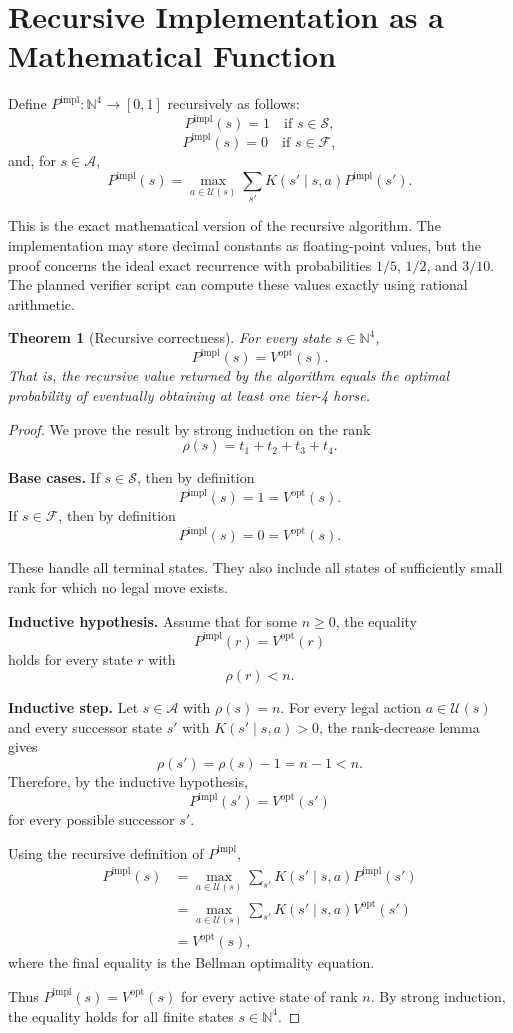 \documentclass[11pt]{article}
\newtheorem{theorem}{Theorem}[section]
\newcommand{\N}{\mathbb{N}}
\newcommand{\Success}{\mathcal{S}}
\newcommand{\Failure}{\mathcal{F}}
\newcommand{\Active}{\mathcal{A}}
\newcommand{\Actions}{\mathcal{U}}
\newcommand{\rank}{\rho}
\newcommand{\impl}{\mathrm{impl}}
\newcommand{\opt}{\mathrm{opt}}
\begin{document}
\section{Recursive Implementation as a Mathematical Function}

Define \(P^\impl:\N^4\to[0,1]\) recursively as follows:
\[
    P^\impl(s)=1\quad\text{if }s\in\Success,
\]
\[
    P^\impl(s)=0\quad\text{if }s\in\Failure,
\]
and, for \(s\in\Active\),
\[
    P^\impl(s)=
    \max_{a\in\Actions(s)}
    \sum_{s'}K(s'\mid s,a)P^\impl(s').
\]

This is the exact mathematical version of the recursive algorithm.  The implementation may store decimal constants as floating-point values, but the proof concerns the ideal exact recurrence with probabilities \(1/5\), \(1/2\), and \(3/10\).  The planned verifier script can compute these values exactly using rational arithmetic.

\begin{theorem}[Recursive correctness]
For every state \(s\in\N^4\),
\[
    P^\impl(s)=V^\opt(s).
\]
That is, the recursive value returned by the algorithm equals the optimal probability of eventually obtaining at least one tier-4 horse.
\end{theorem}

\begin{proof}
We prove the result by strong induction on the rank
\[
    \rank(s)=t_1+t_2+t_3+t_4.
\]

\textbf{Base cases.}
If \(s\in\Success\), then by definition
\[
    P^\impl(s)=1=V^\opt(s).
\]
If \(s\in\Failure\), then by definition
\[
    P^\impl(s)=0=V^\opt(s).
\]

These handle all terminal states.  They also include all states of sufficiently small rank for which no legal move exists.

\textbf{Inductive hypothesis.}
Assume that for some \(n\ge0\), the equality
\[
    P^\impl(r)=V^\opt(r)
\]
holds for every state \(r\) with
\[
    \rank(r)<n.
\]

\textbf{Inductive step.}
Let \(s\in\Active\) with \(\rank(s)=n\).  For every legal action \(a\in\Actions(s)\) and every successor state \(s'\) with \(K(s'\mid s,a)>0\), the rank-decrease lemma gives
\[
    \rank(s')=\rank(s)-1=n-1<n.
\]
Therefore, by the inductive hypothesis,
\[
    P^\impl(s')=V^\opt(s')
\]
for every possible successor \(s'\).

Using the recursive definition of \(P^\impl\),
\[
\begin{aligned}
    P^\impl(s)
    &=
    \max_{a\in\Actions(s)}
    \sum_{s'}K(s'\mid s,a)P^\impl(s')\\
    &=
    \max_{a\in\Actions(s)}
    \sum_{s'}K(s'\mid s,a)V^\opt(s')\\
    &=
    V^\opt(s),
\end{aligned}
\]
where the final equality is the Bellman optimality equation.

Thus \(P^\impl(s)=V^\opt(s)\) for every active state of rank \(n\).  By strong induction, the equality holds for all finite states \(s\in\N^4\).
\end{proof}
\end{document}
